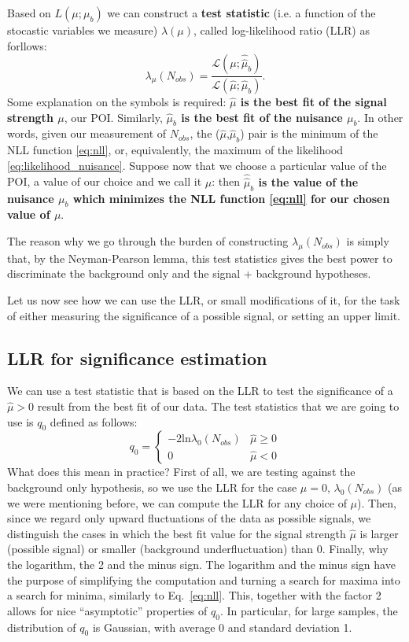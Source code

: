 \documentclass[a4paper,12pt]{article}
\begin{document}
Based on $L(\mu;\mu_b)$ we can construct a {\bf test statistic} (i.e. a
function of the stocastic variables we measure) $\lambda(\mu)$,
called log-likelihood ratio (LLR) as
forllows:
\begin{equation}
\lambda_\mu(N_{obs})=\frac{\mathcal{L}(\mu;\hat{\hat{\mu}}_b)}{\mathcal{L}(\hat{\mu};\hat{\mu}_b)}.
\label{eq:llr}
\end{equation}
Some explanation on the symbols is required:  {\bf $\hat{\mu}$ is the best fit of
the signal strength $\mu$}, our POI. Similarly, {\bf $\hat{\mu}_b$ is the best fit
of the nuisance $\mu_b$}. In other words, given our measurement of $N_{obs}$,
the ($\hat{\mu}$,$\hat{\mu}_b$) pair is the
minimum of the NLL function \ref{eq:nll}, or, equivalently, the maximum of the
likelihood \ref{eq:likelihood_nuisance}. Suppose now that we choose a
particular value of the POI, a value of our choice and we call it $\mu$: then
{\bf $\hat{\hat{\mu}}_b$ is the value of the nuisance $\mu_b$ which minimizes the
NLL function \ref{eq:nll} for our chosen value of $\mu$}.

The reason why we go through the burden of constructing $\lambda_\mu(N_{obs})$
is simply that, by the Neyman-Pearson lemma, this test statistics gives the
best power to discriminate the background only and the signal + background
hypotheses.

Let us now see how we can use the LLR, or small modifications of it, for the
task of either measuring the significance of a possible signal, or setting an
upper limit.

\subsection{LLR for significance estimation}
We can use a test statistic that is based on the LLR to test the significance
of a $\hat{\mu}>0$ result from the best fit of our data. The test statistics
that we are going to use is $q_{0}$ defined as follows:
\begin{equation}
q_0=\begin{cases}
-2\mathrm{ln}\lambda_0(N_{obs}) & \hat{\mu}\geq0 \\
0 & \hat{\mu}<0
\end{cases}
\label{eq:teststat_signif}
\end{equation}
What does this mean in practice? First of all, we are testing against the
background only hypothesis, so we use the LLR for the case $\mu=0$,
$\lambda_0(N_{obs})$ (as we were mentioning before, we can compute the LLR for
any choice of $\mu$).
Then, since we regard only upward fluctuations of the data as possible
signals, we distinguish the cases in which the best fit value for the signal
strength $\hat{\mu}$ is larger (possible signal) or smaller (background
underfluctuation) than 0. Finally, why the logarithm, the 2 and the minus
sign. The logarithm and the minus sign have the purpose of simplifying the
computation and turning a search for maxima into a search for minima,
similarly to Eq.~\ref{eq:nll}. This, together with the factor 2 allows for
nice ``asymptotic'' properties of $q_0$. In particular, for large samples, the
distribution of $q_0$ is Gaussian, with average 0 and standard deviation 1.
\end{document}
